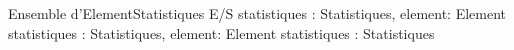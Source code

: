 	{Ensemble d'Element}{Statistiques}
	{E/S statistiques : Statistiques, element: Element}
	{statistiques : Statistiques, element: Element}{\naturel}
	{statistiques : Statistiques}{\naturel}
